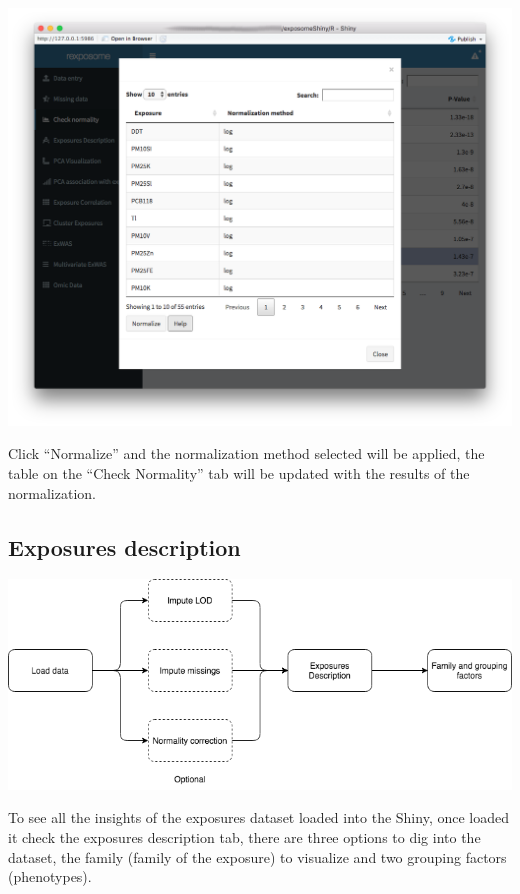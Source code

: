 \documentclass[
]{book}
\begin{document}
\includegraphics{images/analysis3_3.png}

Click ``Normalize'' and the normalization method selected will be applied, the table on the ``Check Normality'' tab will be updated with the results of the normalization.

\hypertarget{exposures-description-1}{%
\subsection{Exposures description}\label{exposures-description-1}}

\includegraphics{images/analysis4_1.png}

To see all the insights of the exposures dataset loaded into the Shiny, once loaded it check the exposures description tab, there are three options to dig into the dataset, the family (family of the exposure) to visualize and two grouping factors (phenotypes).
\end{document}
